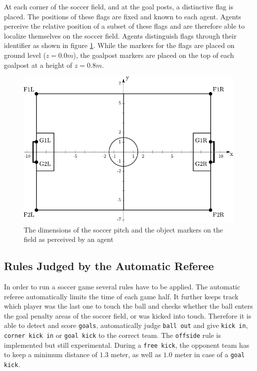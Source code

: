 At each corner of the soccer field, and at the goal posts, a distinctive
flag is placed. The positions of these flags are fixed and known to
each agent. Agents perceive the relative position of a subset of
these flags and are therefore able to localize themselves on the soccer
field. Agents distinguish flags through their identifier as shown in figure
\ref{fig:pitch}. While the markers for the flags are placed on ground level
($z=0.0m$), the goalpost markers are placed on the top of each goalpost at a
height of $z=0.8m$.

\begin{figure}[htbp]
  \centering
  \includegraphics[width=\textwidth]{fig/pitch2}
  \caption{The dimensions of the soccer pitch and the object markers on the
  field as perceived by an agent}
  \label{fig:pitch}
\end{figure}





\subsection{Rules Judged by the Automatic Referee}
In order to run a soccer game several rules have to be applied.
The automatic referee automatically limits the time of each game
half. It further keeps track which player was the last one to touch
the ball and checks whether the ball enters the goal penalty areas of
the soccer field, or was kicked into touch. Therefore it is able to detect and
score \texttt{goals}, automatically judge \texttt{ball out} and give \texttt{kick
in}, \texttt{corner kick in} or \texttt{goal kick} to the correct team. The
\texttt{offside} rule is implemented but still experimental.
During a \texttt{free kick}, the opponent team has to keep a minimum distance of
$1.3$ meter, as well as $1.0$ meter in case of a \texttt{goal kick}. 

